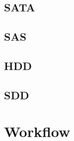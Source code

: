 \documentclass[
  color, %
  table, %
  lof,   %
  lot,   %
]{fithesis3}
\begin{document}
\section{SATA}
\section{SAS}
\section{HDD}
\section{SDD}

\chapter{Workflow}



\end{document}
